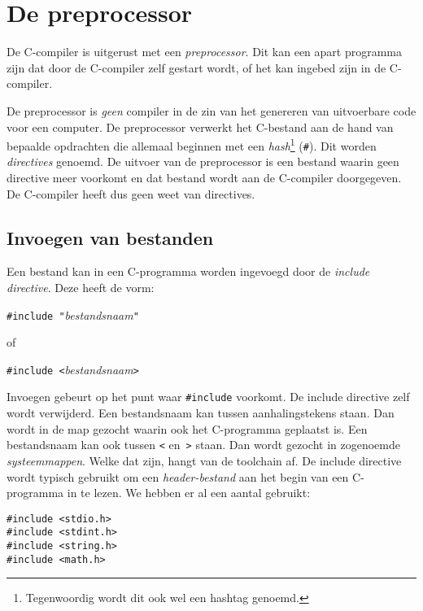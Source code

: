 \chapter{De preprocessor}
\label{cha:preprocessor}
\thispagestyle{empty}

De C-compiler is uitgerust met een \textsl{preprocessor}. Dit kan een apart programma zijn dat door de C-compiler zelf gestart wordt, of het kan ingebed zijn in de C-compiler.

De preprocessor is \textsl{geen} compiler in de zin van het genereren van uitvoerbare code voor een computer. De preprocessor verwerkt het C-bestand aan de hand van bepaalde opdrachten die allemaal beginnen met een \textsl{hash}\footnote{Tegenwoordig wordt dit ook wel een hashtag genoemd.} (\texttt{\#}). Dit worden \textsl{directives} genoemd. De uitvoer van de preprocessor is een bestand waarin geen directive meer voorkomt en dat bestand wordt aan de C-compiler doorgegeven. De C-compiler heeft dus geen weet van directives.

\section{Invoegen van bestanden}
Een bestand kan in een C-programma worden ingevoegd door de \textsl{include directive}. Deze heeft de vorm:

\hspace*{1em}\texttt{\#include "{}}\textsl{bestandsnaam}\texttt{"}

of

\hspace*{1em}\texttt{\#include <}\textsl{bestandsnaam}\texttt{>}

Invoegen gebeurt op het punt waar \texttt{\#include} voorkomt. De include directive zelf wordt verwijderd. Een bestandsnaam kan tussen aanhalingstekens staan. Dan wordt in de map gezocht waarin ook het C-programma geplaatst is. Een bestandsnaam kan ook tussen \texttt{<} en~\texttt{>} staan. Dan wordt gezocht in zogenoemde \textsl{systeemmappen}. Welke dat zijn, hangt van de toolchain af. De include directive wordt typisch gebruikt om een \textsl{header-bestand} aan het begin van een C-programma in te lezen. We hebben er al een aantal gebruikt:

\hspace*{1em}\texttt{\#include <stdio.h>}\\
\hspace*{1em}\texttt{\#include <stdint.h>}\\
\hspace*{1em}\texttt{\#include <string.h>}\\
\hspace*{1em}\texttt{\#include <math.h>}

